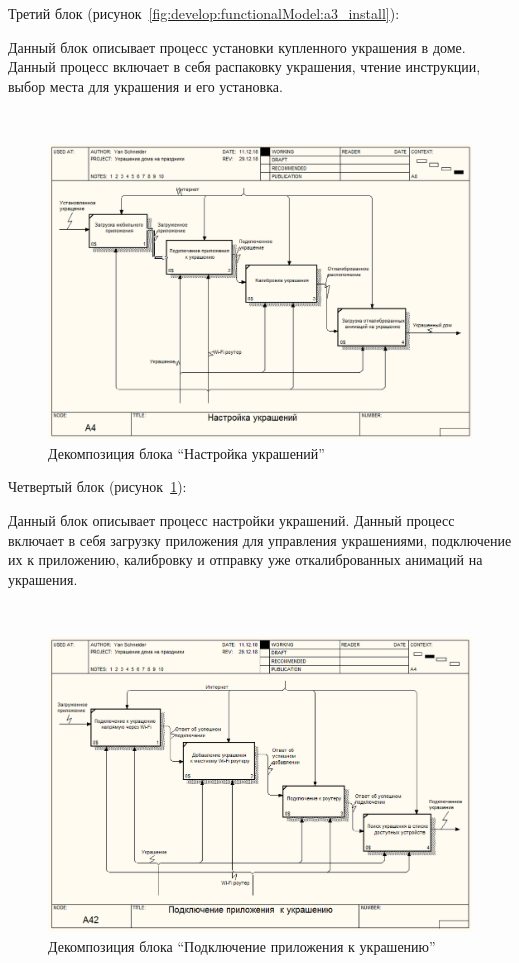 Третий блок (рисунок~\ref{fig:develop:functionalModel:a3_install}):

Данный блок описывает процесс установки купленного украшения в доме. Данный процесс включает в себя распаковку украшения, чтение инструкции, выбор места для украшения и его установка.

 ~
\begin{figure}[H]
\centering
	\includegraphics[scale=0.45]{figures/functionalModel/a4_settings.jpg}
	\caption{Декомпозиция блока ``Настройка украшений''}
	\label{fig:develop:functionalModel:a4_settings}
\end{figure}

Четвертый блок (рисунок~\ref{fig:develop:functionalModel:a4_settings}):

Данный блок описывает процесс настройки украшений. Данный процесс включает в себя загрузку приложения для управления украшениями, подключение их к приложению, калибровку и отправку уже откалиброванных анимаций на украшения. 

~
\begin{figure}[H]
\centering
	\includegraphics[scale=0.45]{figures/functionalModel/a42_connecting.jpg}
	\caption{Декомпозиция блока ``Подключение приложения к украшению''}
	\label{fig:develop:functionalModel:a42_connecting}
\end{figure}

